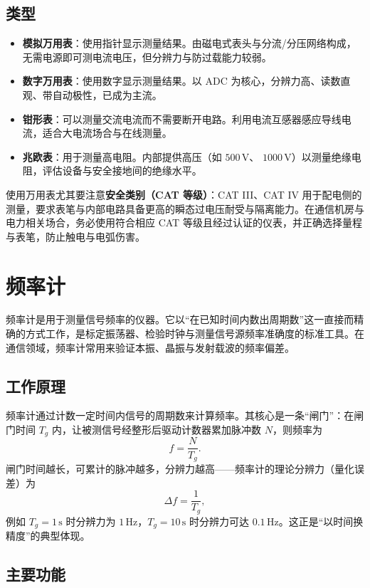 \subsection{类型}

\begin{itemize}
    \item \textbf{模拟万用表}：使用指针显示测量结果。由磁电式表头与分流/分压网络构成，无需电源即可测电流电压，但分辨力与防过载能力较弱。
    \item \textbf{数字万用表}：使用数字显示测量结果。以 ADC 为核心，分辨力高、读数直观、带自动极性，已成为主流。
    \item \textbf{钳形表}：可以测量交流电流而不需要断开电路。利用电流互感器感应导线电流，适合大电流场合与在线测量。
    \item \textbf{兆欧表}：用于测量高电阻。内部提供高压（如 $500\,\mathrm{V}$、 $1000\,\mathrm{V}$）以测量绝缘电阻，评估设备与安全接地间的绝缘水平。
\end{itemize}

使用万用表尤其要注意\textbf{安全类别（CAT 等级）}：CAT III、CAT IV 用于配电侧的测量，要求表笔与内部电路具备更高的瞬态过电压耐受与隔离能力。在通信机房与电力相关场合，务必使用符合相应 CAT 等级且经过认证的仪表，并正确选择量程与表笔，防止触电与电弧伤害。

\section{频率计}
\label{sec:frequency_counter}

频率计是用于测量信号频率的仪器。它以“在已知时间内数出周期数”这一直接而精确的方式工作，是标定振荡器、检验时钟与测量信号源频率准确度的标准工具。在通信领域，频率计常用来验证本振、晶振与发射载波的频率偏差。

\subsection{工作原理}

频率计通过计数一定时间内信号的周期数来计算频率。其核心是一条“闸门”：在闸门时间 $T_g$ 内，让被测信号经整形后驱动计数器累加脉冲数 $N$，则频率为
\[
    f = \frac{N}{T_g} .
\]
闸门时间越长，可累计的脉冲越多，分辨力越高——频率计的理论分辨力（量化误差）为
\[
    \Delta f = \frac{1}{T_g} ,
\]
例如 $T_g = 1\,\mathrm{s}$ 时分辨力为 $1\,\mathrm{Hz}$，$T_g = 10\,\mathrm{s}$ 时分辨力可达 $0.1\,\mathrm{Hz}$。这正是“以时间换精度”的典型体现。

\subsection{主要功能}

